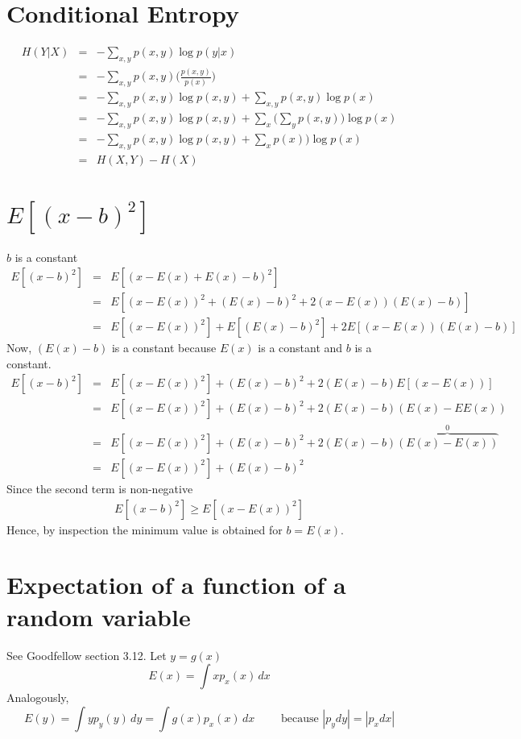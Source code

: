 \documentclass{article}
\newcommand{\beq}{\begin{equation}}
\newcommand{\eeq}{\end{equation}}
\newcommand{\ber}{\begin{eqnarray}}
\newcommand{\eer}{\end{eqnarray}}
\begin{document}
\section{Conditional Entropy}
\ber
H(Y|X) &=& -\sum_{x,y}p(x,y)\log{p(y|x)} \\
&=&  -\sum_{x,y}p(x,y)\Big(\frac{p(x,y)}{p(x)}\Big) \\
&=&  -\sum_{x,y}p(x,y)\log{p(x,y)} + \sum_{x,y}p(x,y)\log{p(x)} \\
&=& -\sum_{x,y}p(x,y)\log{p(x,y)} + \sum_{x}\Big(\sum_{y}p(x,y)\Big)\log{p(x)} \\
&=& -\sum_{x,y}p(x,y)\log{p(x,y)} + \sum_{x}p(x)\Big)\log{p(x)} \\
&=& H(X,Y)- H(X)
\eer
\section{$E[(x-b)^2]$}
$b$ is a constant 
\ber
E[(x-b)^2] &=& E[(x-E(x)+E(x)-b)^2] \\
&=& E[(x-E(x))^2 + (E(x)-b)^2 + 2(x-E(x))(E(x)-b)]\\
&=& E[(x-E(x))^2] + E[(E(x)-b)^2] + 2E[(x-E(x))(E(x)-b)]
\eer
Now, $(E(x)-b)$ is a constant because $E(x)$ is a constant and $b$ is a constant.
\ber
E[(x-b)^2] &=& E[(x-E(x))^2] + (E(x)-b)^2 + 2(E(x)-b)E[(x-E(x))] \\
&=& E[(x-E(x))^2] + (E(x)-b)^2 + 2(E(x)-b)(E(x)-EE(x)) \\
&=& E[(x-E(x))^2] + (E(x)-b)^2 + 2(E(x)-b)\overbrace{(E(x)-E(x))}^{0}\\
&=& E[(x-E(x))^2] + (E(x)-b)^2
\eer
Since the second term is non-negative
\ber
E[(x-b)^2]\ge E[(x-E(x))^2]
\eer
Hence, by inspection the minimum value is obtained for $b=E(x)$.
\section{Expectation of a function of a random variable}
See Goodfellow section 3.12. Let $y=g(x)$
\beq
E(x) = \int xp_x(x)\,dx
\eeq
Analogously,
\beq
E(y) = \int yp_y(y)\,dy = \int g(x) p_x(x)\,dx \qquad \text{ because } |p_ydy|=|p_xdx|
\eeq
\end{document}
